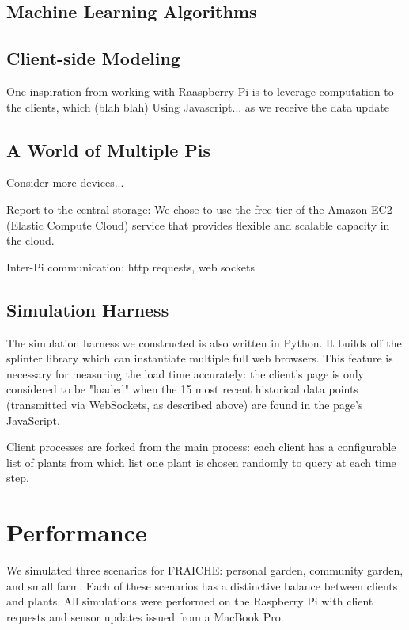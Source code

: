 \documentclass[a4paper]{acm_proc_article-sp}
\begin{document}
\subsection{Machine Learning Algorithms}

\subsection{Client-side Modeling}

One inspiration from working with Raaspberry Pi is to leverage computation to the clients, which (blah blah)
Using Javascript... as we receive the data update

\subsection{A World of Multiple Pis}

Consider more devices...

Report to the central storage: We chose to use the free tier of the Amazon EC2 (Elastic Compute Cloud) service that provides flexible and scalable capacity in the cloud. 

Inter-Pi communication: http requests, web sockets

\subsection{Simulation Harness}

The simulation harness we constructed is also written in Python.  It builds off the splinter \cite{} library which can instantiate multiple full web browsers.  This feature is necessary for measuring the load time accurately: the client's page is only considered to be "loaded" when the 15 most recent historical data points (transmitted via WebSockets, as described above) are found in the page's JavaScript.

Client processes are forked from the main process: each client has a configurable list of plants from which list one plant is chosen randomly to query at each time step.  

\section{Performance}

We simulated three scenarios for FRAICHE: personal garden, community garden, and small farm.  Each of these scenarios has a distinctive balance between clients and plants.  All simulations were performed on the Raspberry Pi with client requests and sensor updates issued from a MacBook Pro.
\end{document}
